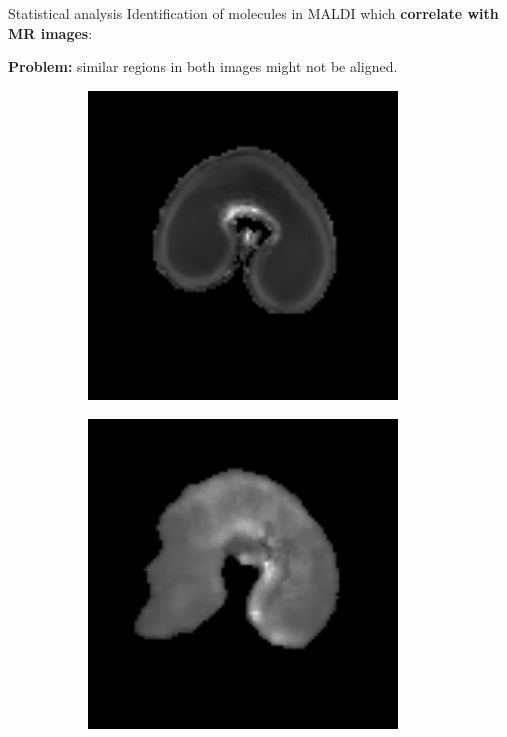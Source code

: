 \documentclass[10pt]{beamer}
\begin{document}
\begin{frame}{Statistical analysis}
  Identification of molecules in MALDI which \textbf{correlate with MR images}:

  \textbf{Problem:} similar regions in both images might not be aligned.

  \begin{figure}[ht]
  \centering
  \begin{subfigure}[t]{0.33\textwidth}
    \centering
    \includegraphics[width=0.9\textwidth]{fig/t2_6_original}
    \caption{}
    \label{subfig:t2_6_original}
  \end{subfigure}%
  \begin{subfigure}[t]{0.33\textwidth}
    \centering
    \includegraphics[width=0.9\textwidth]{fig/msi_6_original}

\end{subfigure}
\end{figure}
\end{frame}
\end{document}
